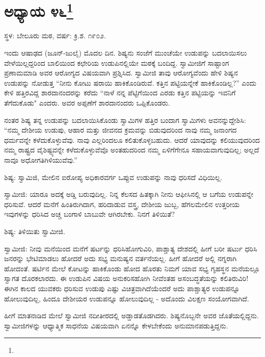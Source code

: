 \chapter[ಅಧ್ಯಾಯ ೪೬]{ಅಧ್ಯಾಯ ೪೬\protect\footnote{}}

\begin{center}
ಸ್ಥಳ: ಬೇಲೂರು ಮಠ, ವರ್ಷ: ಕ್ರಿ.ಶ. ೧೯೦೨.
\end{center}

ಇಂದು ಆಷಾಢದ (ಜೂನ್-ಜುಲೈ) ಮೊದಲ ದಿನ. ಶಿಷ್ಯನು ಸಂಜೆಗೆ ಮುಂಚೆಯೇ ಉಡುಪನ್ನು ಬದಲಾಯಿಸಲು ವೇಳೆಯಿಲ್ಲದ್ದರಿಂದ ಬಾಲಿಯಿಂದ ಕಛೇರಿಯ ಉಡುಪಿನಲ್ಲಿಯೇ ಮಠಕ್ಕೆ ಬಂದಿದ್ದ. ಸ್ವಾಮೀಜಿಗೆ ಸಾಷ್ಟಾಂಗ ಪ್ರಣಾಮಮಾಡಿ ಅವರ ಆರೋಗ್ಯದ ವಿಷಯವಾಗಿ ಪ್ರಶ್ನಿಸಿದ. ಸ್ವಾಮೀಜಿ ತಾವು ಆರೋಗ್ಯವೆಂದು ಹೇಳಿ ಶಿಷ್ಯನ ಉಡುಪನ್ನು ನೋಡುತ್ತ “ನೀನು ಕೋಟು ಷರಾಯಿ ಹಾಕಿಕೊಂಡಿರುವೆ. ಕತ್ತಿನ ಪಟ್ಟಿಯನ್ನೇಕೆ ಹಾಕಿಕೊಂಡಿಲ್ಲ?” ಎಂದು ಕೇಳಿ ಹತ್ತಿರವಿದ್ದ ಶಾರದಾನಂದರನ್ನು ಕರೆದು “ನಾಳೆ ನನ್ನ ಪೆಟ್ಟಿಗೆಯಿಂದ ಎರಡು ಕತ್ತಿನ ಪಟ್ಟಿಯನ್ನು ಇವನಿಗೆ ತೆಗೆದುಕೊಡು" ಎಂದರು. ಅವರ ಅಪ್ಪಣೆಗೆ ಶಾರದಾನಂದರು ಒಪ್ಪಿಕೊಂಡರು.

ನಂತರ ಶಿಷ್ಯ ತನ್ನ ಉಡುಪನ್ನು ಬದಲಾಯಿಸಿಕೊಂಡು ಸ್ವಾಮಿಗಳ ಹತ್ತಿರ ಬಂದಾಗ ಸ್ವಾಮಿಗಳು ಅವನನ್ನುದ್ದೇಶಿಸಿ: “ನಮ್ಮ ದೇಶೀಯ ಉಡುಪು, ಆಹಾರ ಮತ್ತು ಜೀವನದ ಕ್ರಮವನ್ನು ಬಿಡುವುದರಿಂದ ನಾವು ನಮ್ಮ ಜನಾಂಗದ ಧರ್ಮವನ್ನೇ ಕಳೆದುಕೊಳ್ಳುವೆವು. ನಾವು ಎಲ್ಲರಿಂದಲೂ ಕಲಿತುಕೊಳ್ಳಬಹುದು. ಆದರೆ ಯಾವುದನ್ನು ಕಲಿಯುವುದರಿಂದ ನಮ್ಮ ರಾಷ್ಟ್ರದ ವೈಶಿಷ್ಟ್ಯವನ್ನೇ ಕಳೆದುಕೊಳ್ಳುವೆವೊ ಅಂತಹುದರಿಂದ ನಮ್ಮ ಏಳಿಗೆಗೇನೂ ಸಹಾಯವಾಗುವುದಿಲ್ಲ; ಅಲ್ಲದೆ ನಾವೂ ಅಧೋಗತಿಗಿಳಿಯುವೆವು.”

ಶಿಷ್ಯ: ಸ್ವಾಮಿಜಿ, ಮೇಲಿನ ಐರೋಪ್ಯ ಅಧಿಕಾರವರ್ಗ ಒಪ್ಪುವ ಉಡುಪನ್ನು ನಾವು ಧರಿಸದೆ ವಿಧಿಯಿಲ್ಲ.

ಸ್ವಾಮೀಜಿ: ಯಾರೂ ಅದಕ್ಕೆ ಅಡ್ಡಿ ಬರುವುದಿಲ್ಲ. ನಿನ್ನ ಕೆಲಸದ ಹಿತಕ್ಕಾಗಿ ನೀನು ಆಫೀಸಿನಲ್ಲಿ ಆ ಬಗೆಯ ಉಡುಪನ್ನೇ ಧರಿಸುವೆ. ಆದರೆ ಮನೆಗೆ ಹಿಂತಿರುಗಿದಾಗ, ಹರಿದಾಡುವ ವಸ್ತ್ರ, ದೇಶೀಯ ಜುಬ್ಬ, ಹೆಗಲಮೇಲಿನ ಉತ್ತರೀಯ ಇವುಗಳನ್ನು ಧರಿಸಿದ ಅಚ್ಚ ಬಂಗಾಳಿ ಬಾಬುವೇ ಆಗಿರಬೇಕು. ನಿನಗೆ ತಿಳಿಯಿತೆ?

ಶಿಷ್ಯ: ತಿಳಿಯಿತು ಸ್ವಾಮೀಜಿ.

ಸ್ವಾಮೀಜಿ: ನೀವು ಮನೆಯಿಂದ ಮನೆಗೆ ಷರ್ಟನ್ನು ಧರಿಸಿಹೋಗುವಿರಿ, ಪಾಶ್ಚಾತ್ಯ ದೇಶದಲ್ಲಿ ಹೀಗೆ ಬರೀ ಷರ್ಟು ಧರಿಸಿ ಜನರನ್ನು ಭೇಟಿಮಾಡಲು ಹೋದರೆ ಅದು ಸಭ್ಯ ಮನುಷ್ಯನ ವರ್ತನೆಯಲ್ಲ. ಹೀಗೆ ಹೋದರೆ ಅಲ್ಲಿ ನಗ್ನರಾಗಿ ಹೋದಂತೆ. ಷರ್ಟಿನ ಮೇಲೆ ಕೋಟನ್ನು ಹಾಕಿಕೊಂಡು ಹೋದ ಹೊರತು ನಿಮಗೆ ಯಾವ ಸಭ್ಯ ಗೃಹಸ್ಥನ ಮನೆಯಲ್ಲೂ ಸ್ವಾಗತ ದೊರಕಲಾರದು. ಈ ಉಡುಪಿನ ವಿಷಯ ಅನುಕರಿಸಹೋಗಿ ನೀವೆಂತಹ ಅಸಂಬದ್ಧತೆಯನ್ನು ಕಲಿತಿರುವಿರಿ! ಈಗಿನ ಕಾಲದ ಯುವಕರು ಧರಿಸುವ ಉಡುಪು ಎಷ್ಟು ವಿಚಿತ್ರವಾಗಿದೆಯೆಂದರೆ ಅದು ಪಾಶ್ಚಾತ್ಯರ ಉಡುಪನ್ನೂ ಹೋಲುವುದಿಲ್ಲ, ಹಿಂದೂ ದೇಶೀಯರ ಉಡುಪನ್ನೂ ಹೋಲುವುದಿಲ್ಲ - ಅದೊಂದು ವಿಲಕ್ಷಣ ಸಂಯೋಗವಾಗಿದೆ.

ಹೀಗೆ ಮಾತನಾಡಿದ ಮೇಲೆ ಸ್ವಾಮೀಜಿ ನದೀತೀರದಲ್ಲಿ ಅಡ್ಡಾಡತೊಡಗಿದರು. ಶಿಷ್ಯನೊಬ್ಬನೇ ಅವರ ಜೊತೆಯಲ್ಲಿದ್ದನು. ಸ್ವಾಮೀಜಿಗಳನ್ನು ಆಧ್ಯಾತ್ಮಿಕ ಸಾಧನೆಯ ವಿಷಯವಾಗಿ ಏನನ್ನೊ ಕೇಳಬೇಕೆಂದು ಅನುಮಾನಪಡುತ್ತಿದ್ದನು.

